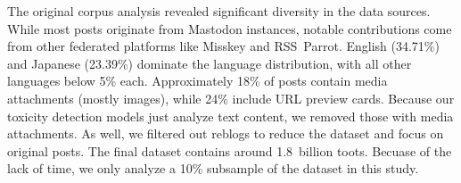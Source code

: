 The original corpus analysis revealed significant diversity in the data sources. While most posts originate from Mastodon instances, notable contributions come from other federated platforms like Misskey and RSS~Parrot. English (34.71\%) and Japanese (23.39\%) dominate the language distribution, with all other languages below 5\% each. Approximately 18\% of posts contain media attachments (mostly images), while 24\% include URL preview cards. Because our toxicity detection models just analyze text content, we removed those with media attachments. As well, we filtered out reblogs to reduce the dataset and focus on original posts. The final dataset contains around 1.8~billion toots. Becuase of the lack of time, we only analyze a 10\% subsample of the dataset in this study.
